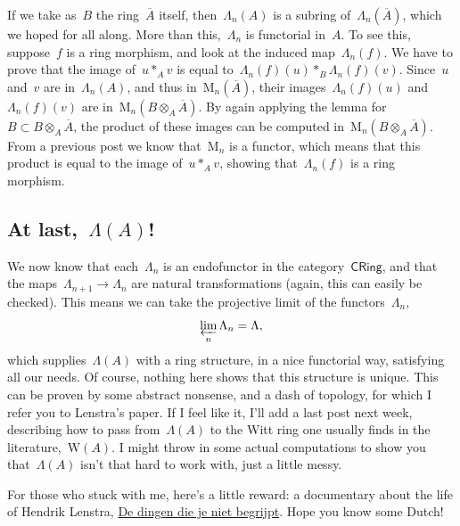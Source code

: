 If we take as~$B$ the ring~$\overline{A}$ itself, then~$\Lambda_{n}(A)$ is a subring of~$\Lambda_{n}(\overline{A})$, which we hoped for all along. More than this,~$\Lambda_{n}$ is functorial in~$A$. To see this, suppose~$f$ is a ring morphism, and look at the induced map~$\Lambda_{n}(f)$. We have to prove that the image of~$u  *_{A}  v$ is equal to~$\Lambda_{n}(f)(u)  *_{B}  \Lambda_{n}(f)(v)$. Since~$u$ and~$v$ are in~$\Lambda_{n}(A)$, and thus in~$\mathrm{M}_{n}(\overline{A})$, their images~$\Lambda_{n}(f)(u)$ and~$\Lambda_{n}(f)(v)$ are in~$\mathrm{M}_{n}(B \otimes_{A} \overline{A})$. By again applying the lemma for~$B \subset B \otimes_{A} \overline{A}$, the product of these images can be computed in~$\mathrm{M}_{n}(B \otimes_{A} \overline{A})$. From a previous post we know that~$\mathrm{M}_{n}$ is a functor, which means that this product is equal to the image of~$u  *_{A}  v$, showing that~$\Lambda_{n}(f)$ is a ring morphism.

\subsection{At last,~$\Lambda(A)$!}

We now know that each~$\Lambda_{n}$ is an endofunctor in the category~$\textsf{CRing}$, and that the maps~$\Lambda_{n+1} \to \Lambda_{n}$ are natural transformations (again, this can easily be checked). This means we can take the projective limit of the functors~$\Lambda_{n}$,
\begin{equation}
  \varprojlim_{n} \Lambda_{n} = \Lambda,
\end{equation}
which supplies~$\Lambda(A)$ with a ring structure, in a nice functorial way, satisfying all our needs. Of course, nothing here shows that this structure is unique. This can be proven by some abstract nonsense, and a dash of topology, for which I refer you to Lenstra's paper. If I feel like it, I'll add a last post next week, describing how to pass from~$\Lambda(A)$ to the Witt ring one usually finds in the literature,~$\mathrm{W}(A)$. I might throw in some actual computations to show you that~$\Lambda(A)$ isn't that hard to work with, just a little messy.

For those who stuck with me, here's a little reward: a documentary about the life of Hendrik Lenstra, \href{http://www.human.nl/programma-35637-magie-van-de-wetenschap}{De dingen die je niet begrijpt}. Hope you know some Dutch!
